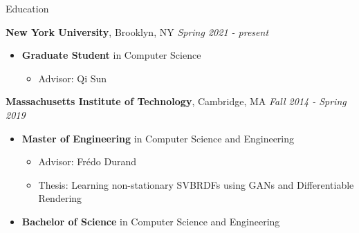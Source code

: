 \documentclass{resume}
\author{Budmonde Duinkharjav}
\begin{document}
\maketitle

\begin{area}{Education}
    \item
        \textbf{New York University}, Brooklyn, NY \hfill \emph{Spring 2021 - present}
        \begin{itemize}
            \item
                \textbf{Graduate Student} in Computer Science
                \begin{itemize}
                    \item Advisor: Qi Sun
                \end{itemize}
        \end{itemize}
    \item
        \textbf{Massachusetts Institute of Technology}, Cambridge, MA \hfill \emph{Fall 2014 - Spring 2019}
        \begin{itemize}
            \item
                \textbf{Master of Engineering} in Computer Science and Engineering
                \begin{itemize}
                    \item Advisor: Fr\'edo Durand
                    \item Thesis: Learning non-stationary SVBRDFs using GANs and Differentiable Rendering
                \end{itemize}
            \item 
                \textbf{Bachelor of Science} in Computer Science and Engineering
        \end{itemize}
\end{area}
\end{document}
